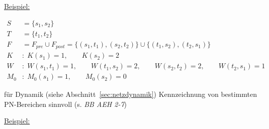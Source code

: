 \underline{Beispiel:}


\begin{subequations}
	\begin{align}
	S &= \{ s_1, s_2 \} \\
	T &= \{ t_1, t_2 \} \\
	F &= F_{pre} \cup F_{post} = \{ (s_1, t_1), (s_2,t_2) \} \cup \{(t_1, s_2), (t_2, s_1) \} \\
	K&:\; K(s_1)=1, \qquad K(s_2)=2 \\
	W&:\; W(s_1,t_1)=1, \qquad W(t_1,s_2)=2, \qquad W(s_2,t_2)=2, \qquad W(t_2,s_1)=1 \\
	M_0&:\; M_0(s_1)=1, \qquad M_0(s_2)=0
	\end{align}
\end{subequations}


für Dynamik (siehe Abschnitt~\ref{sec:netzdynamik}) Kennzeichnung von bestimmten PN-Bereichen sinnvoll (s. \textit{BB AEH 2-7})

\underline{Beispiel: }


